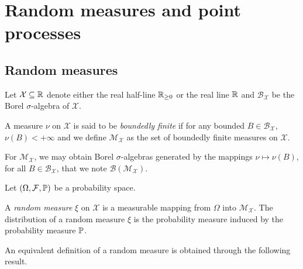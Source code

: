 \section{Random measures and point processes}\label{sec:chap1_random_measures}

\subsection{Random measures}

Let $\mathcal{X} \subseteq {\mathbb R}$ denote either the real half-line ${\mathbb R}_{\geq 0}$ or the real line ${\mathbb R}$ and $\mathcal{B}_{\mathcal{X}}$ be the Borel $\sigma$-algebra of $\mathcal{X}$.

\begin{definition}
    A measure $\nu$ on $\mathcal{X}$ is said to be \emph{boundedly finite} if for any bounded $B\in\mathcal{B}_{\mathcal{X}}$, $\nu(B) < +\infty$ and we define $\mathcal{M}_{\mathcal{X}}$ as the set of boundedly finite measures on $\mathcal{X}$.
\end{definition}

For $\mathcal{M}_{\mathcal{X}}$, we may obtain Borel $\sigma$-algebras generated by the mappings $\nu \mapsto \nu(B)$, for all $B\in\mathcal{B}_{\mathcal{X}}$, that we note $\mathcal{B}(\mathcal{M}_{\mathcal{X}})$.

Let $(\Omega, \mathcal{F}, {\mathbb P})$ be a probability space.

\begin{definition}
    A \emph{random measure} $\xi$ on $\mathcal{X}$ is a measurable mapping from $\Omega$ into $\mathcal{M}_{\mathcal{X}}$.
    The distribution of a random measure $\xi$ is the probability measure induced by the probability measure ${\mathbb P}$.
\end{definition}

An equivalent definition of a random measure is obtained through the following result.


